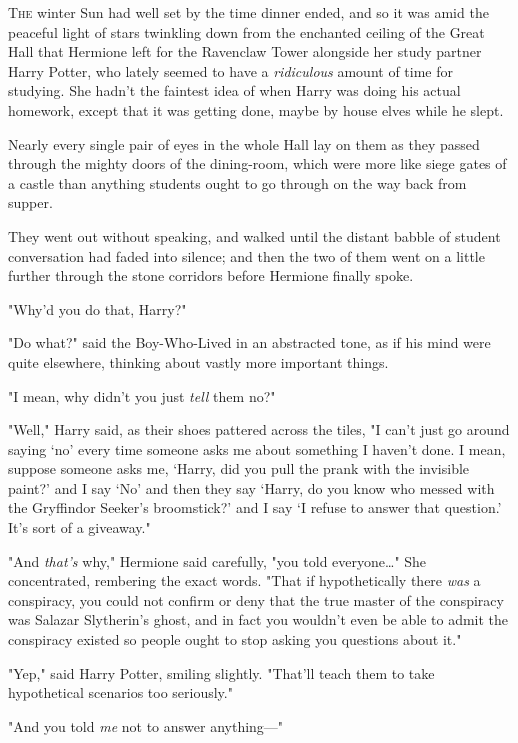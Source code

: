 
\lettrine{T}{he} winter Sun
had well set by the time dinner ended, and so it was amid the peaceful light of
stars twinkling down from the enchanted ceiling of the Great Hall that Hermione
left for the Ravenclaw Tower alongside her study partner Harry Potter, who
lately seemed to have a \emph{ridiculous} amount of time for studying. She
hadn't the faintest idea of when Harry was doing his actual homework, except
that it was getting done, maybe by house elves while he slept.

Nearly every single pair of eyes in the whole Hall lay on them as they passed
through the mighty doors of the dining-room, which were more like siege gates
of a castle than anything students ought to go through on the way back from
supper.

They went out without speaking, and walked until the distant babble of student
conversation had faded into silence; and then the two of them went on a little
further through the stone corridors before Hermione finally spoke.

"Why'd you do that, Harry?"

"Do what?" said the Boy-Who-Lived in an abstracted tone, as if his mind were
quite elsewhere, thinking about vastly more important things.

"I mean, why didn't you just \emph{tell} them no?"

"Well," Harry said, as their shoes pattered across the tiles, "I can't just go
around saying `no' every time someone asks me about something I haven't done. I
mean, suppose someone asks me, `Harry, did you pull the prank with the
invisible paint?' and I say `No' and then they say `Harry, do you know who
messed with the Gryffindor Seeker's broomstick?' and I say `I refuse to answer
that question.' It's sort of a giveaway."

"And \emph{that's} why," Hermione said carefully, "you told everyone{\ldots}"
She concentrated, rembering the exact words. "That if hypothetically there
\emph{was} a conspiracy, you could not confirm or deny that the true master of
the conspiracy was Salazar Slytherin's ghost, and in fact you wouldn't even be
able to admit the conspiracy existed so people ought to stop asking you
questions about it."

"Yep," said Harry Potter, smiling slightly. "That'll teach them to take
hypothetical scenarios too seriously."

"And you told \emph{me} not to answer anything---"


